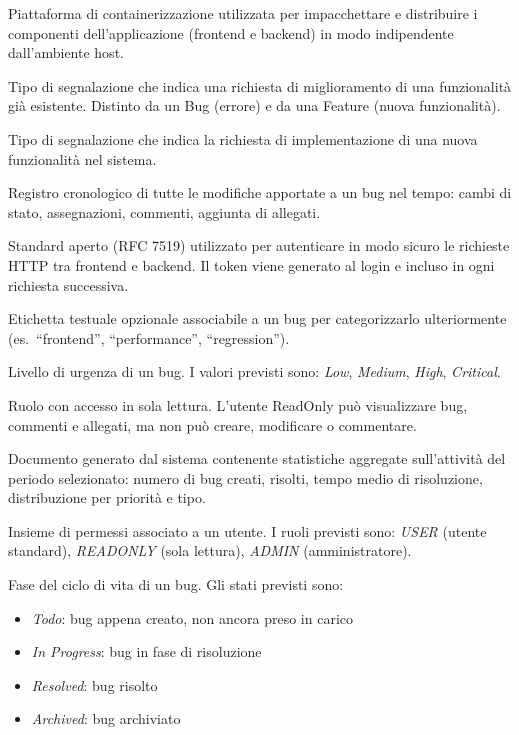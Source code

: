\begin{description}[style=nextline, leftmargin=3cm, labelwidth=2.8cm]
    \item[Docker]
    Piattaforma di containerizzazione utilizzata per impacchettare e distribuire i componenti dell'applicazione (frontend e backend) in modo indipendente dall'ambiente host.

    \item[Enhancement]
    Tipo di segnalazione che indica una richiesta di miglioramento di una funzionalità già esistente. Distinto da un Bug (errore) e da una Feature (nuova funzionalità).

    \item[Feature]
    Tipo di segnalazione che indica la richiesta di implementazione di una nuova funzionalità nel sistema.

    \item[History (Storico)]
    Registro cronologico di tutte le modifiche apportate a un bug nel tempo: cambi di stato, assegnazioni, commenti, aggiunta di allegati.

    \item[JWT (JSON Web Token)]
    Standard aperto (RFC 7519) utilizzato per autenticare in modo sicuro le richieste HTTP tra frontend e backend. Il token viene generato al login e incluso in ogni richiesta successiva.

    \item[Label]
    Etichetta testuale opzionale associabile a un bug per categorizzarlo ulteriormente (es.\ ``frontend'', ``performance'', ``regression'').

    \item[Priorità]
    Livello di urgenza di un bug. I valori previsti sono: \textit{Low}, \textit{Medium}, \textit{High}, \textit{Critical}.

    \item[ReadOnly (Utente)]
    Ruolo con accesso in sola lettura. L'utente ReadOnly può visualizzare bug, commenti e allegati, ma non può creare, modificare o commentare.

    \item[Report Mensile]
    Documento generato dal sistema contenente statistiche aggregate sull'attività del periodo selezionato: numero di bug creati, risolti, tempo medio di risoluzione, distribuzione per priorità e tipo.

    \item[Ruolo]
    Insieme di permessi associato a un utente. I ruoli previsti sono: \textit{USER} (utente standard), \textit{READONLY} (sola lettura), \textit{ADMIN} (amministratore).

    \item[Stato (Status)]
    Fase del ciclo di vita di un bug. Gli stati previsti sono:
    \begin{itemize}
        \item \textit{Todo}: bug appena creato, non ancora preso in carico
        \item \textit{In Progress}: bug in fase di risoluzione
        \item \textit{Resolved}: bug risolto
        \item \textit{Archived}: bug archiviato
    \end{itemize}


\end{description}
